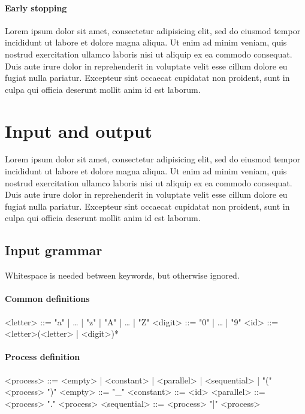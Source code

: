 \paragraph{Early stopping}

Lorem ipsum dolor sit amet, consectetur adipisicing elit, sed do eiusmod tempor incididunt ut labore et dolore magna aliqua. Ut enim ad minim veniam, quis nostrud exercitation ullamco laboris nisi ut aliquip ex ea commodo consequat. Duis aute irure dolor in reprehenderit in voluptate velit esse cillum dolore eu fugiat nulla pariatur. Excepteur sint occaecat cupidatat non proident, sunt in culpa qui officia deserunt mollit anim id est laborum.


\section{Input and output}

Lorem ipsum dolor sit amet, consectetur adipisicing elit, sed do eiusmod tempor incididunt ut labore et dolore magna aliqua. Ut enim ad minim veniam, quis nostrud exercitation ullamco laboris nisi ut aliquip ex ea commodo consequat. Duis aute irure dolor in reprehenderit in voluptate velit esse cillum dolore eu fugiat nulla pariatur. Excepteur sint occaecat cupidatat non proident, sunt in culpa qui officia deserunt mollit anim id est laborum.

\subsection{Input grammar}

Whitespace is needed between keywords, but otherwise ignored.

\paragraph{Common definitions}
\begin{grammar}
<letter> ::= "a" | … | "z" | "A" | … | "Z"
<digit> ::= "0" | …  | "9"
<id> ::= <letter>(<letter> | <digit>)*
\end{grammar}

\paragraph{Process definition}
\begin{grammar}
<process> ::= <empty> | <constant> | <parallel> | <sequential> | "(" <process> ")"
<empty> ::= "_"
<constant> ::= <id>
<parallel> ::= <process> "." <process>
<sequential> ::= <process> "|" <process>
\end{grammar}

